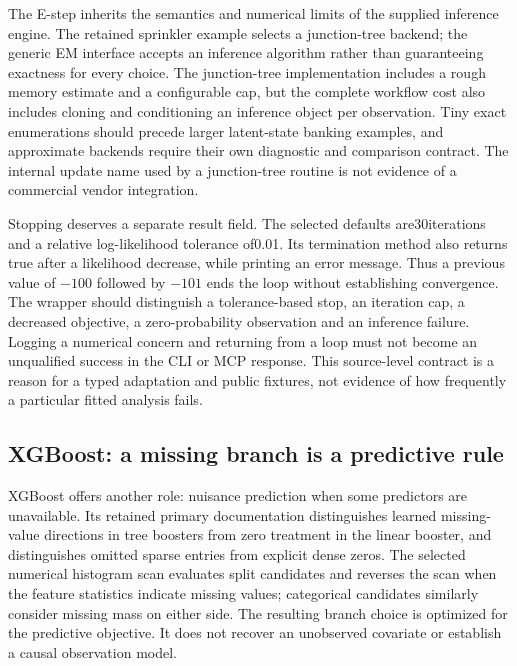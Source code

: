 The E-step inherits the semantics and numerical limits of the supplied inference engine. The retained sprinkler example selects a junction-tree backend; the generic EM interface accepts an inference algorithm rather than guaranteeing exactness for every choice. The junction-tree implementation includes a rough memory estimate and a configurable cap, but the complete workflow cost also includes cloning and conditioning an inference object per observation. Tiny exact enumerations should precede larger latent-state banking examples, and approximate backends require their own diagnostic and comparison contract. The internal update name used by a junction-tree routine is not evidence of a commercial vendor integration.~\citep{exec25_ctm_libdai}

Stopping deserves a separate result field. The selected defaults are30iterations and a relative log-likelihood tolerance of0.01. Its termination method also returns true after a likelihood decrease, while printing an error message. Thus a previous value of $-100$ followed by $-101$ ends the loop without establishing convergence. The wrapper should distinguish a tolerance-based stop, an iteration cap, a decreased objective, a zero-probability observation and an inference failure. Logging a numerical concern and returning from a loop must not become an unqualified success in the CLI or MCP response. This source-level contract is a reason for a typed adaptation and public fixtures, not evidence of how frequently a particular fitted analysis fails.~\citep{exec25_ctm_libdai,exec25_ctm_choice}

\subsection*{XGBoost: a missing branch is a predictive rule}
XGBoost offers another role: nuisance prediction when some predictors are unavailable. Its retained primary documentation distinguishes learned missing-value directions in tree boosters from zero treatment in the linear booster, and distinguishes omitted sparse entries from explicit dense zeros. The selected numerical histogram scan evaluates split candidates and reverses the scan when the feature statistics indicate missing values; categorical candidates similarly consider missing mass on either side. The resulting branch choice is optimized for the predictive objective. It does not recover an unobserved covariate or establish a causal observation model.~\citep{exec25_ctm_xgboost}

